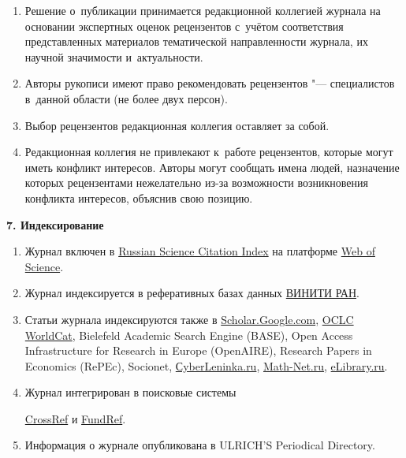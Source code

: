 \begin{enumerate}
\item[12.] Решение о~публикации принимается редакционной коллегией журнала на основании экспертных оценок рецензентов с~учётом соответствия представленных материалов тематической направленности журнала, их научной значимости и~актуальности.

\item[13.] Авторы рукописи имеют право рекомендовать рецензентов "--- специалистов в~данной области (не более двух персон).

\item[14.]  Выбор рецензентов редакционная коллегия оставляет за собой.

\item[15.] Редакционная коллегия не привлекают к~работе рецензентов, которые могут иметь конфликт интересов. Авторы могут сообщать имена людей, назначение которых рецензентами нежелательно из-за возможности возникновения конфликта интересов, объяснив свою позицию.



\end{enumerate}



\smallskip



\noindent

{\bf 7. Индексирование}



\begin{enumerate}

\item[1.] Журнал включен в  \href{http://elibrary.ru/rsci_about.asp}{Russian Science Citation Index} на платформе \href{http://wokinfo.com/products_tools/multidisciplinary/rsci/}{Web of Sci\-ence}. 



\item[2.] Журнал индексируется в реферативных базах данных \href{http://www.viniti.ru}{ВИНИТИ РАН}.

\item[3.] Статьи журнала индексируются также в \href{http://scholar.google.com/scholar?q=Vestn.+Samar.+Gos.+Tekhn.+Univ.+Ser.+Fiz.-Mat.+Nauki}{Scholar.Google.com}, \href{https://goo.gl/zrvH0K}{OCLC WorldCat}, Bielefeld Academic Search Engine (BASE), Open Access Infrastructure for Re\-search in Europe (OpenAIRE), Research Papers in Economics (RePEc), Socionet, \href{http://cyberleninka.ru/journal/n/vestnik-samarskogo-gosudarstvennogo-tehnicheskogo-universiteta-seriya-fiziko-matematicheskie-nauki}{СyberLeninka.ru}, \href{http://goo.gl/EeAvfJ}{Math-Net.ru}, \href{https://elibrary.ru/title_about.asp?id=5784}{eLibrary.ru}. 

\item[4.] Журнал интегрирован в поисковые системы 

\href{http://search.crossref.org/}{CrossRef} и \href{http://search.crossref.org/funding}{FundRef}.

\item[5.] Информация о журнале опубликована в ULRICH’S Periodical Directory. 



\end{enumerate}



